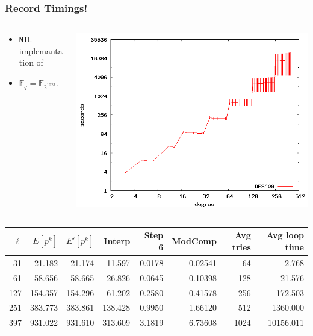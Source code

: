 \documentclass[10pt]{beamer}
\newcommand{\F}{\mathbb{F}}  %
\newcommand{\0}{\mathcal{O}}  %
\begin{document}
\begin{frame}
  \frametitle{Record Timings!}

  
  \begin{columns}
    \begin{column}{0.4\textwidth}
      \begin{itemize}
      \item \texttt{NTL} implemantation of \cite{DFS09}
      \item $\F_q = \F_{2^{1023}}$.
      \end{itemize}
    \end{column}
    \begin{column}{0.6\textwidth}
      \includegraphics[width=\textwidth]{2-1023}

    \end{column}
  \end{columns}
  
  \smallskip
  \footnotesize
  \centering
  \begin{tabular}{r r r r r r r r}
    \hline
    $\ell$ & $E[p^k]$ & $E'[p^k]$ & Interp & Step 6 & ModComp & Avg tries & Avg loop time\\
    \hline
    31 & 21.182 & 21.174 & 11.597 & 0.0178 & 0.02541 & 64 & 2.768 \\
    61 & 58.656 & 58.665 & 26.826 & 0.0645 & 0.10398 & 128 & 21.576 \\
    127 & 154.357 & 154.296 & 61.202 & 0.2580 & 0.41578 & 256 & 172.503 \\
    251 & 383.773 & 383.861 & 138.428 & 0.9950 & 1.66120 & 512 & 1360.000 \\
    397 & 931.022 & 931.610 & 313.609 & 3.1819 & 6.73608 & 1024 & 10156.011 \\
    \hline
  \end{tabular}
\end{frame}
\end{document}
